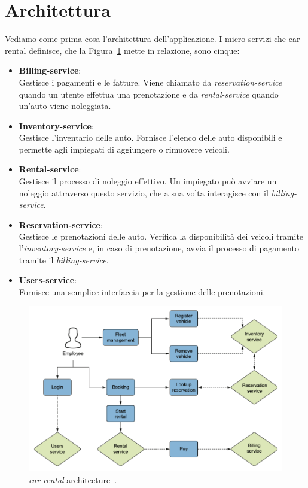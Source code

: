 \section{Architettura}
\label{sec:servizi}
Vediamo come prima cosa l'architettura dell'applicazione. I micro servizi che car-rental definisce, che la Figura~\ref{fig:architecture} mette in relazione, sono cinque:
\begin{itemize}
    \item \textbf{Billing-service}: \\
        Gestisce i pagamenti e le fatture. Viene chiamato da \textit{reservation-service} quando un utente effettua una prenotazione e da \textit{rental-service} quando un'auto viene noleggiata.
    \item \textbf{Inventory-service}: \\
        Gestisce l'inventario delle auto. Fornisce l'elenco delle auto disponibili e permette agli impiegati di aggiungere o rimuovere veicoli.
    \item \textbf{Rental-service}: \\
        Gestisce il processo di noleggio effettivo. Un impiegato può avviare un noleggio attraverso questo servizio, che a sua volta interagisce con il \textit{billing-service}.
    \item \textbf{Reservation-service}: \\
        Gestisce le prenotazioni delle auto. Verifica la disponibilità dei veicoli tramite l'\textit{inventory-service} e, in caso di prenotazione, avvia il processo di pagamento tramite il \textit{billing-service}.
    \item \textbf{Users-service}: \\
        Fornisce una semplice interfaccia per la gestione delle prenotazioni.
\end{itemize}

\begin{figure}[htbp]
    \centering
    \includegraphics[width=\textwidth]{images/2-car-rental/architecture.pdf}
    \caption{\textit{car-rental} architecture~\cite{quarkusinaction}.}
    \label{fig:architecture}
\end{figure}

